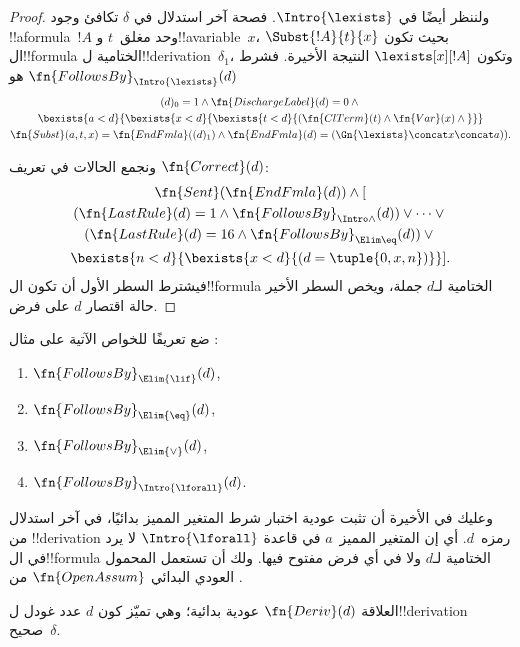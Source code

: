 \documentclass[../../../include/open-logic-section]{subfiles}
\begin{document}
\begin{proof}
  ولننظر أيضًا في $\Intro{\lexists}$.
  فصحة آخر استدلال في $\delta$ تكافئ
  وجود !!a{formula}~$!A$ وحد مغلق~$t$
  و!!a{variable}~$x$، بحيث تكون
  $\Subst{!A}{t}{x}$ ال!!{formula}
  الختامية ل!!{derivation}~$\delta_1$،
  وتكون $\lexists[x][!A]$ النتيجة الأخيرة.
  فشرط $\fn{FollowsBy}_{\Intro{\lexists}}(d)$ هو
  \begin{multline*}
    (d)_0 = 1 \land \fn{DischargeLabel}(d) = 0 \land {} \\
    \bexists{a < d}{\bexists{x<d}{\bexists{t<d}{
          (\fn{ClTerm}(t) \land \fn{Var}(x)  \land {}}}}\\
    \fn{Subst}(a,t,x) = \fn{EndFmla}((d)_1) \land
    \fn{EndFmla}(d) = (\Gn{\lexists} \concat x \concat a)).
  \end{multline*}

  ونجمع الحالات في تعريف $\fn{Correct}(d)$:
  \begin{multline*}
    \fn{Sent}(\fn{EndFmla}(d)) \land [ {}\\
    (\fn{LastRule}(d) = 1 \land
    \fn{FollowsBy}_{\Intro\land}(d)) \lor \dots \lor {}\\
    (\fn{LastRule}(d) = 16 \land \fn{FollowsBy}_{\Elim\eq}(d)) \lor {}\\
    \bexists{n<d}{\bexists{x<d}{(d = \tuple{0, x, n})}}].
  \end{multline*}
  فيشترط السطر الأول أن تكون ال!!{formula} الختامية
  لـ$d$ جملة، ويخص السطر الأخير حالة اقتصار $d$ على فرض.
\end{proof}

\begin{prob}
  ضع تعريفًا للخواص الآتية على مثال
  :
  \begin{enumerate}
  \item $\fn{FollowsBy}_{\Elim{\lif}}(d)$,
  \item $\fn{FollowsBy}_{\Elim{\eq}}(d)$,
  \item $\fn{FollowsBy}_{\Elim{\lor}}(d)$,
  \item $\fn{FollowsBy}_{\Intro{\lforall}}(d)$.
  \end{enumerate}
  وعليك في الأخيرة أن تثبت عودية اختبار شرط
  المتغير المميز بدائيًا، في آخر استدلال من
  !!{derivation} رمزه~$d$. أي إن المتغير
  المميز~$a$ في قاعدة $\Intro{\lforall}$
  لا يرد في ال!!{formula} الختامية لـ$d$
  ولا في أي فرض مفتوح فيها. ولك أن تستعمل
  المحمول العودي البدائي $\fn{OpenAssum}$
  من .
\end{prob}

\begin{prop}
  العلاقة $\fn{Deriv}(d)$ عودية بدائية؛ وهي تميّز
  كون $d$ عدد غودل ل!!{derivation} صحيح~$\delta$.
\end{prop}
\end{document}
